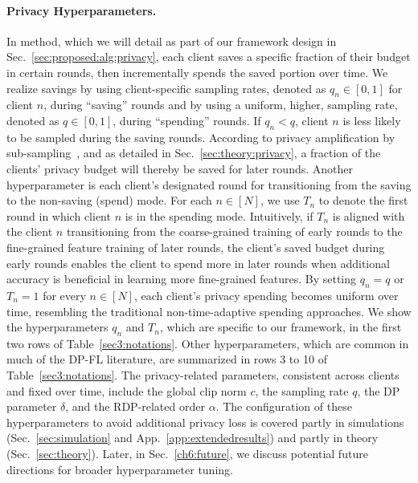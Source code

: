 \paragraph{Privacy Hyperparameters.}
{In \algasgo method, which we will detail as part of our framework design in Sec.~\ref{sec:proposed:alg:privacy}, each client saves a specific fraction of their budget in certain rounds, then incrementally spends the saved portion over time. We realize savings by using client-specific sampling rates, denoted as $q_n\in [0,1]$ for client $n$, during ``saving'' rounds and by using a uniform, higher, sampling rate, denoted as $q \in [0,1]$, during ``spending'' rounds. If $q_n<q$, client $n$ is less likely to be sampled during the saving rounds. According to privacy amplification by sub-sampling~\citep {beimel2014bounds}, and as detailed in Sec.~\ref{sec:theory:privacy}, a fraction of the clients' privacy budget will thereby be saved for later rounds. Another hyperparameter is each client's designated round for transitioning from the saving to the non-saving (spend) mode. For each $n\in [N]$, we use $T_n$ to denote the first round in which client $n$ is in the spending mode. Intuitively, if $T_n$ is aligned with the client $n$ transitioning from the coarse-grained training of early rounds to the fine-grained feature training of later rounds, the client's saved budget during early rounds enables the client to spend more in later rounds when additional accuracy is beneficial in learning more fine-grained features. By setting $q_n=q$ or $T_n=1$ for every $n\in [N]$, each client's privacy spending becomes uniform over time, resembling the traditional non-time-adaptive spending approaches. We show the hyperparameters $q_n$ and $T_n$, which are specific to our framework, in the first two rows of Table~\ref{sec3:notations}. Other hyperparameters, which are common in much of the DP-FL literature, are summarized in rows 3 to 10 of Table~\ref{sec3:notations}. The privacy-related parameters, consistent across clients and fixed over time, include the global clip norm $c$, the sampling rate $q$, the DP parameter $\delta$, and the RDP-related order $\alpha$. The configuration of these hyperparameters to avoid additional privacy loss is covered partly in simulations (Sec.~\ref{sec:simulation} and App.~\ref{app:extendedresults}) and partly in theory (Sec.~\ref{sec:theory}). Later, in Sec.~\ref{ch6:future}, we discuss potential future directions for broader hyperparameter tuning. }


